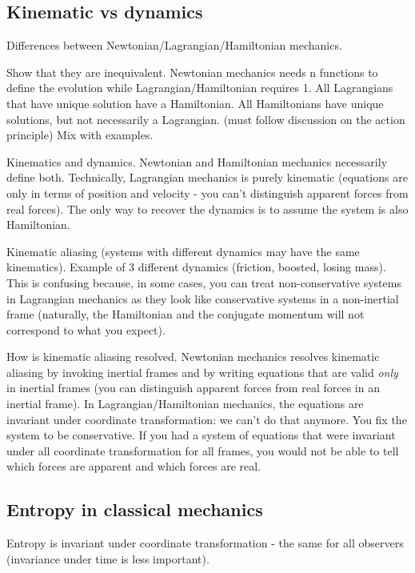 \documentclass{article}
\begin{document}
\subsection{Kinematic vs dynamics}

Differences between Newtonian/Lagrangian/Hamiltonian mechanics.

Show that they are inequivalent. Newtonian mechanics needs n functions to define the evolution while Lagrangian/Hamiltonian requires 1. All Lagrangians that have unique solution have a Hamiltonian. All Hamiltonians have unique solutions, but not necessarily a Lagrangian. (must follow discussion on the action principle) Mix with examples.

Kinematics and dynamics. Newtonian and Hamiltonian mechanics necessarily define both. Technically, Lagrangian mechanics is purely kinematic (equations are only in terms of position and velocity - you can't distinguish apparent forces from real forces). The only way to recover the dynamics is to assume the system is also Hamiltonian.

Kinematic aliasing (systems with different dynamics may have the same kinematics). Example of 3 different dynamics (friction, boosted, losing mass). This is confusing because, in some cases, you can treat non-conservative systems in Lagrangian mechanics as they look like conservative systems in a non-inertial frame (naturally, the Hamiltonian and the conjugate momentum will not correspond to what you expect).

How is kinematic aliasing resolved. Newtonian mechanics resolves kinematic aliasing by invoking inertial frames and by writing equations that are valid \emph{only} in inertial frames (you can distinguish apparent forces from real forces in an inertial frame).  In Lagrangian/Hamiltonian mechanics, the equations are invariant under coordinate transformation: we can't do that anymore. You fix the system to be conservative. If you had a system of equations that were invariant under all coordinate transformation for all frames, you would not be able to tell which forces are apparent and which forces are real.

\subsection{Entropy in classical mechanics}

Entropy is invariant under coordinate transformation - the same for all observers (invariance under time is less important).
\end{document}
